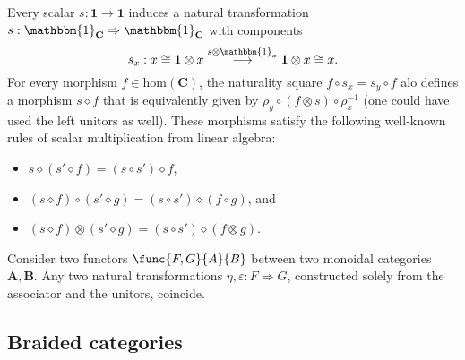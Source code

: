     \begin{property}
        Every scalar $s:\mathbf{1}\rightarrow\mathbf{1}$ induces a natural transformation $s:\mathbbm{1}_{\mathbf{C}}\Rightarrow\mathbbm{1}_{\mathbf{C}}$ with components \[s_x:x\cong\mathbf{1}\otimes x\overset{s\otimes\mathbbm{1}_x}{\longrightarrow}\mathbf{1}\otimes x\cong x.\] For every morphism $f\in\mathrm{hom}(\mathbf{C})$, the naturality square $f\circ s_x=s_y\circ f$ alo defines a morphism $s\diamond f$ that is equivalently given by $\rho_y\circ(f\otimes s)\circ\rho^{-1}_x$ (one could have used the left unitors as well). These morphisms satisfy the following well-known rules of scalar multiplication from linear algebra:
        \begin{itemize}
            \item $s\diamond(s'\diamond f) = (s\circ s')\diamond f$,
            \item $(s\diamond f)\circ(s'\diamond g) = (s\circ s')\diamond(f\circ g)$, and
            \item $(s\diamond f)\otimes(s'\diamond g) = (s\circ s')\diamond(f\otimes g)$.
        \end{itemize}
    \end{property}


    \begin{theorem}
        Consider two functors $\func{F,G}{A}{B}$ between two monoidal categories $\mathbf{A},\mathbf{B}$. Any two natural transformations $\eta,\varepsilon:F\Rightarrow G$, constructed solely from the associator and the unitors, coincide.
    \end{theorem}

\subsection{Braided categories}

